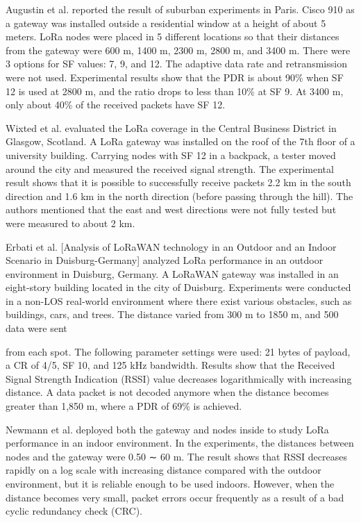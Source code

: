 Augustin et al.
\cite{augustin_study_2016} reported the result of suburban experiments in Paris.
Cisco 910 as a gateway was installed outside a residential window at a height of about 5 meters.
LoRa nodes were placed in 5 different locations so that their distances from the gateway were 600 m, 1400 m, 2300 m, 2800 m,
	and 3400 m.
There were 3 options for SF values: 7, 9,
	and 12.
The adaptive data rate and retransmission were not used.
Experimental results show that the PDR is about 90\% when SF 12 is used at 2800 m,
and the ratio drops to less than 10\% at SF 9.
At 3400 m,
	only about 40\% of the received packets have SF 12.

Wixted et al.
\cite{wixted_evaluation_2016} evaluated the LoRa coverage in the Central Business District in Glasgow,
	Scotland.
A LoRa gateway was installed on the roof of the 7th floor of a university building.
Carrying nodes with SF 12 in a backpack,
	a tester moved around the city and measured the received signal strength.
The experimental result shows that it is possible to successfully receive packets 2.2 km in the south direction and 1.6 km in the north direction (before passing through the hill).
The authors mentioned that the east and west directions were not fully tested but were measured to about 2 km.

Erbati et al.
[Analysis of LoRaWAN technology in an Outdoor and an Indoor Scenario in Duisburg-Germany] analyzed LoRa performance in an outdoor environment in Duisburg,
	Germany.
A LoRaWAN gateway was installed in an eight-story building located in the city of Duisburg.
Experiments were conducted in a non-LOS real-world environment where there exist various obstacles,
	such as buildings,
	cars,
	and trees.
The distance varied from 300 m to 1850 m,
	and 500 data were sent

from each spot.
The following parameter settings were used: 21 bytes of payload,
	a CR of 4/5,
	SF 10,
	and 125 kHz bandwidth.
Results show that the Received Signal Strength Indication (RSSI) value decreases logarithmically with increasing distance.
A data packet is not decoded anymore when the distance becomes greater than 1,850 m,
	where a PDR of 69\% is achieved.

Newmann et al.
\cite{neumann_indoor_2016} deployed both the gateway and nodes inside to study LoRa performance in an indoor environment.
In the experiments,
	the distances between nodes and the gateway were 0.50 ∼ 60 m.
The result shows that RSSI decreases rapidly on a log scale with increasing distance compared with the outdoor environment,
	but it is reliable enough to be used indoors.
However,
	when the distance becomes very small,
	packet errors occur frequently as a result of a bad cyclic redundancy check (CRC).

